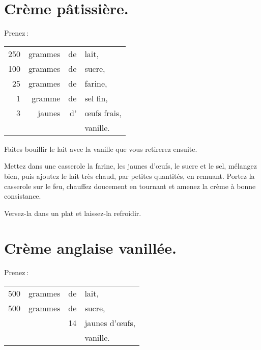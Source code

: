 \section*{\centering Crème pâtissière.}
{}

Prenez :

\footnotesize
\begin{longtable}{rrrp{16em}}
  250 & grammes & de & lait,                                                                              \\
  100 & grammes & de & sucre,                                                                             \\
   25 & grammes & de & farine,                                                                            \\
    1 & gramme  & de & sel fin,                                                                           \\
    3 & jaunes  & d' & œufs frais,                                                                        \\
      &         &    & vanille.                                                                           \\
\end{longtable}
\normalsize

Faites bouillir le lait avec la vanille que vous retirerez ensuite.

Mettez dans une casserole la farine, les jaunes d'œufs, le sucre et le sel,
mélangez bien, puis ajoutez le lait très chaud, par petites quantités, en
remuant. Portez la casserole sur le feu, chauffez doucement en tournant et
amenez la crème à bonne consistance.

Versez-la dans un plat et laissez-la refroidir.

\label{pg0856} \hypertarget{p0856}{}
\section*{\centering Crème anglaise vanillée.}
{}

Prenez :

\footnotesize
\begin{longtable}{rrrp{16em}}
    500 & grammes & de & lait,                                                                            \\
    500 & grammes & de & sucre,                                                                           \\
        &         & 14 & jaunes d'œufs,                                                                   \\
        &         &    & vanille.                                                                         \\
\end{longtable}
\normalsize

